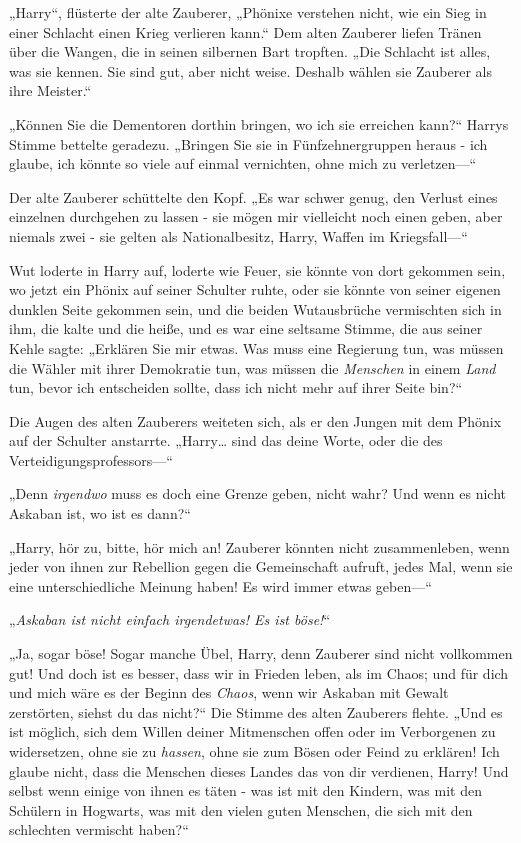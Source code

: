 {„Harry“, flüsterte der alte Zauberer, „Phönixe verstehen nicht, wie ein Sieg in einer Schlacht einen Krieg verlieren kann.“ Dem alten Zauberer liefen Tränen über die Wangen, die in seinen silbernen Bart tropften. „Die Schlacht ist alles, was sie kennen. Sie sind gut, aber nicht weise. Deshalb wählen sie Zauberer als ihre Meister.“

„Können Sie die Dementoren dorthin bringen, wo ich sie erreichen kann?“ Harrys Stimme bettelte geradezu. „Bringen Sie sie in Fünfzehnergruppen heraus - ich glaube, ich könnte so viele auf einmal vernichten, ohne mich zu verletzen—“

Der alte Zauberer schüttelte den Kopf. „Es war schwer genug, den Verlust eines einzelnen durchgehen zu lassen - sie mögen mir vielleicht noch einen geben, aber niemals zwei - sie gelten als Nationalbesitz, Harry, Waffen im Kriegsfall—“

Wut loderte in Harry auf, loderte wie Feuer, sie könnte von dort gekommen sein, wo jetzt ein Phönix auf seiner Schulter ruhte, oder sie könnte von seiner eigenen dunklen Seite gekommen sein, und die beiden Wutausbrüche vermischten sich in ihm, die kalte und die heiße, und es war eine seltsame Stimme, die aus seiner Kehle sagte: „Erklären Sie mir etwas. Was muss eine Regierung tun, was müssen die Wähler mit ihrer Demokratie tun, was müssen die \emph{Menschen} in einem \emph{Land} tun, bevor ich entscheiden sollte, dass ich nicht mehr auf ihrer Seite bin?“

Die Augen des alten Zauberers weiteten sich, als er den Jungen mit dem Phönix auf der Schulter anstarrte. „Harry… sind das deine Worte, oder die des Verteidigungsprofessors—“

„Denn \emph{irgendwo} muss es doch eine Grenze geben, nicht wahr? Und wenn es nicht Askaban ist, wo ist es dann?“

„Harry, hör zu, bitte, hör mich an! Zauberer könnten nicht zusammenleben, wenn jeder von ihnen zur Rebellion gegen die Gemeinschaft aufruft, jedes Mal, wenn sie eine unterschiedliche Meinung haben! Es wird immer etwas geben—“

„\emph{Askaban ist nicht einfach irgendetwas! Es ist böse!}“

„Ja, sogar böse! Sogar manche Übel, Harry, denn Zauberer sind nicht vollkommen gut! Und doch ist es besser, dass wir in Frieden leben, als im Chaos; und für dich und mich wäre es der Beginn des \emph{Chaos}, wenn wir Askaban mit Gewalt zerstörten, siehst du das nicht?“ Die Stimme des alten Zauberers flehte. „Und es ist möglich, sich dem Willen deiner Mitmenschen offen oder im Verborgenen zu widersetzen, ohne sie zu \emph{hassen}, ohne sie zum Bösen oder Feind zu erklären! Ich glaube nicht, dass die Menschen dieses Landes das von dir verdienen, Harry! Und selbst wenn einige von ihnen es täten - was ist mit den Kindern, was mit den Schülern in Hogwarts, was mit den vielen guten Menschen, die sich mit den schlechten vermischt haben?“

}
